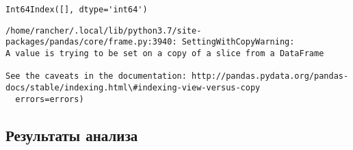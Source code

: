 \documentclass[11pt]{article}
\begin{document}
    \begin{Verbatim}[commandchars=\\\{\}]
Int64Index([], dtype='int64')

    \end{Verbatim}

    \begin{Verbatim}[commandchars=\\\{\}]
/home/rancher/.local/lib/python3.7/site-packages/pandas/core/frame.py:3940: SettingWithCopyWarning: 
A value is trying to be set on a copy of a slice from a DataFrame

See the caveats in the documentation: http://pandas.pydata.org/pandas-docs/stable/indexing.html\#indexing-view-versus-copy
  errors=errors)

    \end{Verbatim}

    \subsection{Результаты
анализа}\label{ux440ux435ux437ux443ux43bux44cux442ux430ux442ux44b-ux430ux43dux430ux43bux438ux437ux430}
\end{document}
